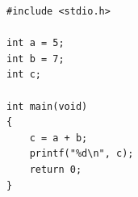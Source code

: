 \begin{lstlisting}[style=csrc]
#include <stdio.h>

int a = 5;
int b = 7;
int c;

int main(void)
{
    c = a + b;
    printf("%d\n", c);
    return 0;
}
\end{lstlisting}

